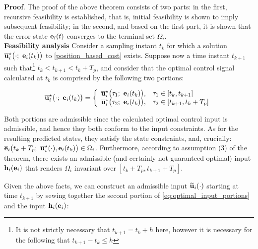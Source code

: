 \textbf{Proof}. The proof of the above theorem consists of two parts:
in the first, recursive feasibility is established, that is, initial
feasibility is shown to imply subsequent feasibility; in the second, and based
on the first part, it is shown that the error state $\bm{\mathbf{e}}_i(t)$ converges
to the terminal set $\Omega_i$.\\

\textbf{Feasibility analysis}
Consider a sampling instant $t_k$ for which a
solution $\overline{\vect{u}}_i^{\star}\big(\cdot;\ \vect{e}_i(t_k)\big)$ to
\eqref{position_based_cost} exists.
Suppose now a time instant $t_{k+1}$ such that\footnote{It is not strictly necessary
that $t_{k+1} = t_k + h$ here, however it is necessary for the following that
$t_{k+1} - t_k \leq h$} $t_k < t_{k+1} < t_k + T_p$, and consider that the
optimal control signal calculated at $t_k$ is comprised by the following two
portions:

\begin{equation}
  \overline{\vect{u}}_i^{\star}\big(\cdot;\ \vect{e}_i(t_k)\big) = \left\{
      \begin{array}{ll}
        \overline{\vect{u}}_i^{\star}\big(\tau_1;\ \vect{e}_i(t_k)\big), & \tau_1 \in [t_k, t_{k+1}] \\
        \overline{\vect{u}}_i^{\star}\big(\tau_2;\ \vect{e}_i(t_k)\big), & \tau_2 \in [t_{k+1}, t_k + T_p]
      \end{array}
      \right.
  \label{eq:optimal_input_portions}
\end{equation}

Both portions are admissible since the calculated optimal control input is
admissible, and hence they both conform to the input constraints.
As for the resulting predicted states, they satisfy the state constraints, and,
crucially: $\overline{\vect{e}}_i\big(t_k + T_p;\ \overline{\vect{u}}_i^{\star}(\cdot), \vect{e}_i(t_k)\big) \in \Omega_i$.
Furthermore, according to assumption (3) of the theorem, there exists an
admissible (and certainly not guaranteed optimal) input $\bm{\mathbf{h}}_i(\bm{\mathbf{e}}_i)$ that
renders $\Omega_i$ invariant over $[t_k + T_p, t_{k+1} + T_p]$.

Given the above facts, we can construct an admissible input
$\widetilde{\bm{\mathbf{u}}}_i(\cdot)$  starting at time $t_{k+1}$ by sewing together
the second portion of \eqref{eq:optimal_input_portions} and the input
$\bm{\mathbf{h}}_i(\bm{\mathbf{e}}_i)$:

